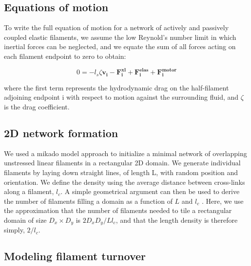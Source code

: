 \documentclass[10pt,letterpaper]{article}
\begin{document}
\subsection*{Equations of motion}

To write the full equation of motion for a network of actively and passively coupled elastic filaments, we assume the low Reynold's number limit in which inertial forces can be neglected, and we equate the sum of all forces acting on each filament endpoint to zero to obtain:

\begin{equation}
\label{eqn:syst3}
0=-l_s\zeta\mathbf{ v_i} -\mathbf{F^{xl}_i}+ \mathbf{F^{elas}_i}+\mathbf{F^{motor}_i} 
\end{equation}

where the first term represents the hydrodynamic drag on the half-filament adjoining endpoint i with respect to motion against the surrounding fluid, and $\zeta$ is the drag coefficient.

\subsection*{2D network formation}

We used a mikado model approach \cite{Unterberger2014} to initialize a minimal network of overlapping unstressed linear filaments in a rectangular 2D domain. We generate individual filaments by laying down straight lines, of length L, with random position and orientation. We define the density using the average distance between cross-links along a filament, $l_c$. A simple geometrical argument can then be used to derive the number of filaments filling a domain as a function of $L$ and $l_c$ \cite{theo_hlm}.  Here, we use the approximation that the number of filaments needed to tile a rectangular domain of size $D_x \times D_y$  is $2D_xD_y/Ll_c$, and that the length density is therefore simply, $2/l_c$. 

\subsection*{Modeling filament turnover}
\end{document}
